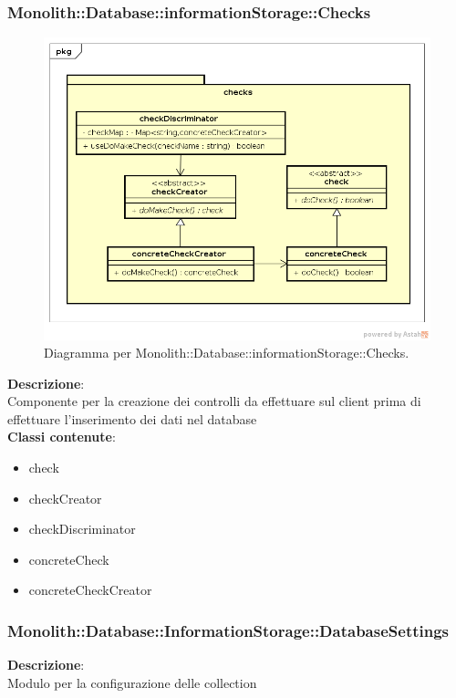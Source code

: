 \subsubsection{Monolith::Database::informationStorage::Checks}
   \FloatBarrier
   \begin{figure}[ht]
   \centering
\includegraphics[width=\textwidth,keepaspectratio]{img/controls}
   \caption{Diagramma per Monolith::Database::informationStorage::Checks.}
\end{figure}
\FloatBarrier
\textbf{Descrizione}:\\
 Componente per la creazione dei controlli da effettuare sul client prima di effettuare l'inserimento dei dati nel database 
\\ \textbf{Classi contenute}:\\
\begin{itemize}
\item check
\item checkCreator
\item checkDiscriminator
\item concreteCheck
\item concreteCheckCreator
\end{itemize}


\clearpage

\subsubsection{Monolith::Database::InformationStorage::DatabaseSettings}
\textbf{Descrizione}:\\
 Modulo per la configurazione delle collection 



